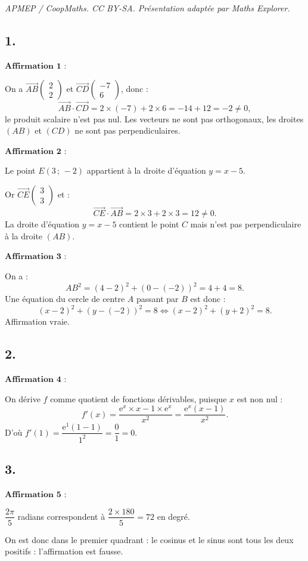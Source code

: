 \documentclass[10pt]{article}
\providecommand{\e}{{\mathrm{e}}}
\begin{document}
\noindent\textit{APMEP / CoopMaths. CC BY-SA. Présentation adaptée par Maths Explorer.}\par\medskip
\subsection*{1.}

\(\textbf{Affirmation 1 :}\)

On a \( \overrightarrow{AB} \begin{pmatrix} 2 \\ 2 \end{pmatrix} \) et \( \overrightarrow{CD} \begin{pmatrix} -7 \\ 6 \end{pmatrix} \), donc :
\[
\overrightarrow{AB} \cdot \overrightarrow{CD} = 2 \times (-7) + 2 \times 6 = -14 + 12 = -2 \neq 0,
\]
le produit scalaire n'est pas nul. Les vecteurs ne sont pas orthogonaux, les droites \((AB)\) et \((CD)\) ne sont pas perpendiculaires.

\(\textbf{Affirmation 2 :}\)

Le point \(E(3 \,;\, -2)\) appartient à la droite d'équation \(y = x - 5\).

Or \( \overrightarrow{CE} \begin{pmatrix} 3 \\ 3 \end{pmatrix} \) et :
\[
\overrightarrow{CE} \cdot \overrightarrow{AB} = 2 \times 3 + 2 \times 3 = 12 \neq 0.
\]
La droite d'équation \(y = x - 5\) contient le point \(C\) mais n'est pas perpendiculaire à la droite \((AB)\).

\(\textbf{Affirmation 3 :}\)

On a :
\[
AB^2 = (4 - 2)^2 + (0 - (-2))^2 = 4 + 4 = 8.
\]
Une équation du cercle de centre \(A\) passant par \(B\) est donc :
\[
(x - 2)^2 + (y - (-2))^2 = 8 \iff (x - 2)^2 + (y + 2)^2 = 8.
\]
Affirmation vraie.

\subsection*{2.}

\(\textbf{Affirmation 4 :}\)

On dérive \(f\) comme quotient de fonctions dérivables, puisque \(x\) est non nul :
\[
f'(x) = \dfrac{\e^x \times x - 1 \times \e^x}{x^2} = \dfrac{\e^x (x - 1)}{x^2}.
\]
D'où \(f'(1) = \dfrac{\e^1 (1 - 1)}{1^2} = \dfrac{0}{1} = 0\).

\subsection*{3.}

\(\textbf{Affirmation 5 :}\)

\(\dfrac{2\pi}{5}\) radians correspondent à \(\dfrac{2 \times 180}{5} = 72\) en degré.

On est donc dans le premier quadrant : le cosinus et le sinus sont tous les deux positifs : l'affirmation est fausse.
\end{document}
